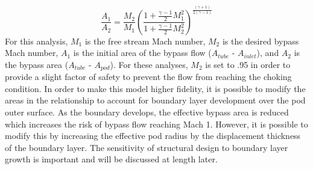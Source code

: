 	\begin{equation}
		\label{eq:mach_to_area}
		\frac{A_{1}}{A_{2}}=\frac{M_{2}}{M_{1}} \left( \frac{1+\frac{\gamma -1}{2}M_{1}^{2}}{1+\frac{\gamma -1}{2}M_{2}^{2}} \right)^{\frac{( \gamma +1 )}{2 ( \gamma -1  )}}
	\end{equation}
	For this analysis, $M_1$ is the free stream Mach number, $M_2$ is the desired bypass Mach number, $A_1$ is the initial area of the bypass flow ($A_{tube}$ - $A_{inlet}$), and $A_2$ is the bypass area ($A_{tube}$ - $A_{pod}$). For these analyses, $M_2$ is set to .95 in order to provide a slight factor of safety to prevent the flow from reaching the choking condition.
	In order to make this model higher fidelity, it is possible to modify the areas in the relationship to account for boundary layer development over the pod outer surface. As the boundary develops, the effective bypass area is reduced which increases the risk of bypass flow reaching Mach 1. However, it is possible to modify this by increasing the effective pod radius by the displacement thickness of the boundary layer. The sensitivity of structural design to boundary layer growth is important and will be discussed at length later.
